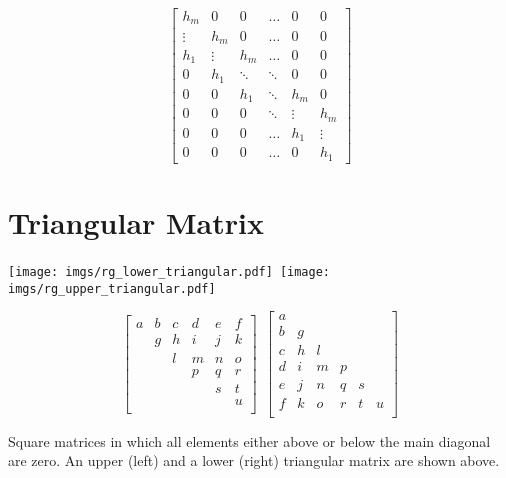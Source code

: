 \begin{equation}
\begin{bmatrix}
  h_m &   0 &   0 &      \hdots &   0 &   0 \\
  \vdots & h_m &   0 &   \hdots &   0 &   0 \\
  h_1 & \vdots & h_m &   \hdots &   0 &   0 \\
    0 & h_1 & \ddots & \ddots &   0 &   0 \\
    0 &   0 & h_1 &    \ddots & h_m &   0 \\
    0 &   0 &   0 &    \ddots & \vdots & h_m \\
    0 &   0 &   0 &      \hdots & h_1 & \vdots \\
    0 &   0 &   0 &      \hdots &   0 & h_1 
\end{bmatrix}
\end{equation}


\section{Triangular Matrix}

\begin{center}
\texttt{[image: imgs/rg\_lower\_triangular.pdf]}~\texttt{[image: imgs/rg\_upper\_triangular.pdf]}
\end{center}

\begin{equation}
\begin{bmatrix}
a & b & c & d & e & f \\
  & g & h & i & j & k \\
  &   & l & m & n & o \\
  &   &   & p & q & r \\
  &   &   &   & s & t \\
  &   &   &   &   & u \\
\end{bmatrix}
~
~
\begin{bmatrix}
a &   &   &   &   &   \\
b & g &   &   &   &   \\
c & h & l &   &   &   \\
d & i & m & p &   &   \\
e & j & n & q & s &   \\
f & k & o & r & t & u \\
\end{bmatrix}
\end{equation}

Square matrices in which all elements either above or below the main diagonal are zero. An upper (left) and a lower (right) triangular matrix are shown above.

